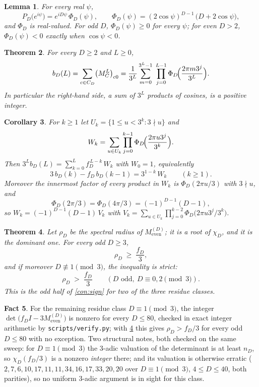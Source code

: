 \documentclass[11pt]{amsart}
\newtheorem{theorem}{Theorem}[section]
\newtheorem{lemma}[theorem]{Lemma}
\newtheorem{corollary}[theorem]{Corollary}
\theoremstyle{definition}
\newtheorem{fact}[theorem]{Fact}
\theoremstyle{remark}
\begin{document}
\begin{lemma}
\label{lem:circle}
For every real $\psi$,
\[
P_D\bigl(e^{i\psi}\bigr) = e^{iD\psi}\, \Phi_D(\psi), \qquad \Phi_D(\psi) = (2\cos\psi)^{D-1}\,\bigl(D + 2\cos\psi\bigr),
\]
and $\Phi_D$ is real-valued. For odd $D$, $\Phi_D(\psi) \ge 0$ for every $\psi$; for even $D > 2$, $\Phi_D(\psi) < 0$ exactly when $\cos\psi < 0$.
\end{lemma}

\begin{theorem}
\label{thm:product}
For every $D \ge 2$ and $L \ge 0$,
\[
b_D(L) = \sum_{c \in C_D} \bigl( M_C^L \bigr)_{c0}
= \frac{1}{3^L} \sum_{m=0}^{3^L-1} \; \prod_{j=0}^{L-1} \Phi_D\!\Bigl( \frac{2\pi m 3^j}{3^L} \Bigr).
\]
In particular the right-hand side, a sum of $3^L$ products of cosines, is a positive integer.
\end{theorem}

\begin{corollary}
\label{cor:step}
For $k \ge 1$ let $U_k = \{ 1 \le u < 3^k : 3 \nmid u \}$ and
\[
W_k = \sum_{u \in U_k} \prod_{j=0}^{k-1} \Phi_D\!\Bigl( \frac{2\pi u 3^j}{3^k} \Bigr).
\]
Then $3^L b_D(L) = \sum_{k=0}^{L} f_D^{\,L-k}\, W_k$ with $W_0 = 1$, equivalently
\[
3\, b_D(k) - f_D\, b_D(k-1) = 3^{1-k}\, W_k \qquad (k \ge 1).
\]
Moreover the innermost factor of every product in $W_k$ is $\Phi_D(2\pi u/3)$ with $3 \nmid u$, and
\[
\Phi_D(2\pi/3) = \Phi_D(4\pi/3) = (-1)^{D-1}(D-1),
\]
so $W_k = (-1)^{D-1}(D-1)\, V_k$ with $V_k = \sum_{u \in U_k} \prod_{j=0}^{k-2} \Phi_D\bigl(2\pi u 3^j/3^k\bigr)$.
\end{corollary}

\begin{theorem}
\label{thm:sign}
Let $\rho_D$ be the spectral radius of $M_{\mathrm{even}}^{(D)}$; it is a root of $\chi_D$, and it is the dominant one. For every odd $D \ge 3$,
\[
\rho_D \;\ge\; \frac{f_D}{3},
\]
and if moreover $D \not\equiv 1 \pmod 3$, the inequality is strict:
\[
\rho_D \;>\; \frac{f_D}{3} \qquad (D \text{ odd},\ D \equiv 0, 2 \pmod 3).
\]
This is the odd half of \cref{con:sign} for two of the three residue classes.
\end{theorem}

\begin{fact}
\label{fact:signodd}
For the remaining residue class $D \equiv 1 \pmod 3$, the integer $\det\bigl(f_D I - 3 M_{\mathrm{even}}^{(D)}\bigr)$ is nonzero for every $D \le 80$, checked in exact integer arithmetic by \texttt{scripts/verify.py}; with \cref{thm:sign} this gives $\rho_D > f_D/3$ for every odd $D \le 80$ with no exception. Two structural notes, both checked on the same sweep: for $D \equiv 1 \pmod 3$ the $3$-adic valuation of the determinant is at least $n_D$, so $\chi_D(f_D/3)$ is a nonzero \emph{integer} there; and its valuation is otherwise erratic ($2, 7, 6, 10, 17, 11, 11, 34, 16, 17, 33, 20, 20$ over $D \equiv 1 \pmod 3$, $4 \le D \le 40$, both parities), so no uniform $3$-adic argument is in sight for this class.
\end{fact}
\end{document}
